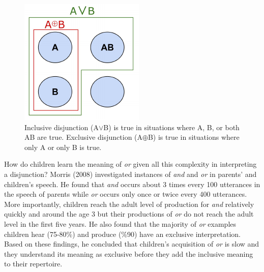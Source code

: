 \documentclass[10pt, letterpaper]{article}
\newenvironment{CodeChunk}{}{}
\begin{document}
\begin{CodeChunk}
\begin{figure}[b]

{\centering \includegraphics{figs/aorb-1} 

}

\caption[Inclusive disjunction (A$\vee$B) is true in situations where A, B, or both AB are true]{Inclusive disjunction (A$\vee$B) is true in situations where A, B, or both AB are true. Exclusive disjunction (A$\oplus$B) is true in situations where only A or only B is true.}\label{fig:aorb}
\end{figure}
\end{CodeChunk}

How do children learn the meaning of \emph{or} given all this complexity
in interpreting a disjunction? Morris (2008) investigated instances of
\emph{and} and \emph{or} in parents' and children's speech. He found
that \emph{and} occurs about 3 times every 100 utterances in the speech
of parents while \emph{or} occurs only once or twice every 400
utterances. More importantly, children reach the adult level of
production for \emph{and} relatively quickly and around the age 3 but
their productions of \emph{or} do not reach the adult level in the first
five years. He also found that the majority of \emph{or} examples
children hear (75-80\%) and produce (\%90) have an exclusive
interpretation. Based on these findings, he concluded that children's
acquisition of \emph{or} is slow and they understand its meaning as
exclusive before they add the inclusive meaning to their repertoire.
\end{document}
